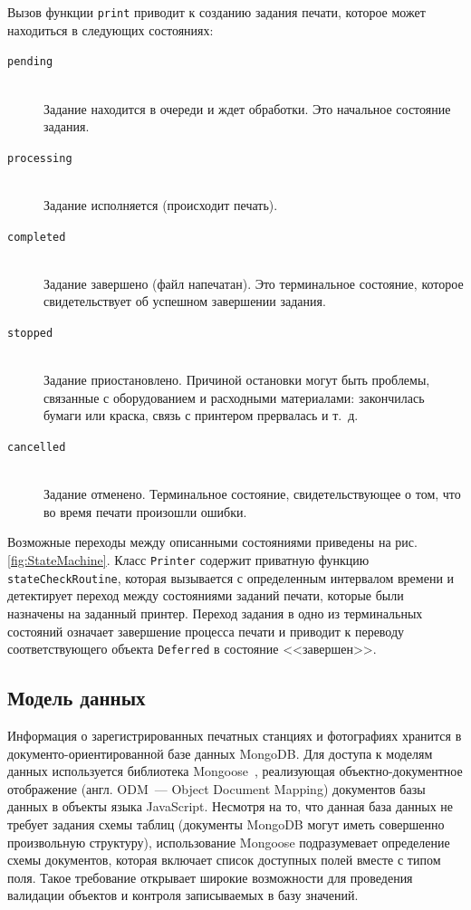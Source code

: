 \documentclass[a4paper,14pt,href,draft]{article}
\begin{document}
Вызов функции \texttt{print} приводит к созданию задания печати, которое может находиться в следующих состояниях:
\begin{description}
  \item[\texttt{pending}] \hfill\\Задание находится в очереди и ждет обработки. Это начальное состояние задания.
  \item[\texttt{processing}] \hfill\\Задание исполняется (происходит печать).
  \item[\texttt{completed}] \hfill\\Задание завершено (файл напечатан). Это терминальное состояние, которое свидетельствует
  об успешном завершении задания.
  \item[\texttt{stopped}] \hfill\\Задание приостановлено. Причиной остановки могут быть проблемы, связанные с оборудованием и
  расходными материалами: закончилась бумаги или краска, связь с принтером прервалась и т.~д.
  \item[\texttt{cancelled}] \hfill\\Задание отменено. Терминальное состояние, свидетельствующее о том, что во время печати
  произошли ошибки.
\end{description}

Возможные переходы между описанными состояниями приведены на рис. \ref{fig:StateMachine}. Класс \texttt{Printer} содержит
приватную функцию \texttt{stateCheckRou\-ti\-ne}, которая вызывается с определенным интервалом времени и детектирует
переход между состояниями заданий печати, которые были назначены на заданный принтер. Переход задания в одно из терминальных
состояний означает завершение процесса печати и приводит к переводу соответствующего объекта \texttt{Deferred} в состояние
<<завершен>>.


\subsection{Модель данных}
Информация о зарегистрированных печатных станциях и фотографиях хранится в документо-ориентированной базе данных MongoDB.
Для доступа к моделям данных используется библиотека Mongoose~\cite{Mongoose}, реализующая объектно-документное отображение
(англ. ODM~--- Object Document Mapping) документов базы данных в объекты языка JavaScript. Несмотря на то, что данная
база данных не требует задания схемы таблиц (документы MongoDB могут иметь совершенно произвольную структуру), использование
Mongoose подразумевает определение схемы документов, которая включает список доступных полей вместе с типом поля. Такое
требование открывает широкие возможности для проведения валидации объектов и контроля записываемых в базу значений.
\end{document}
